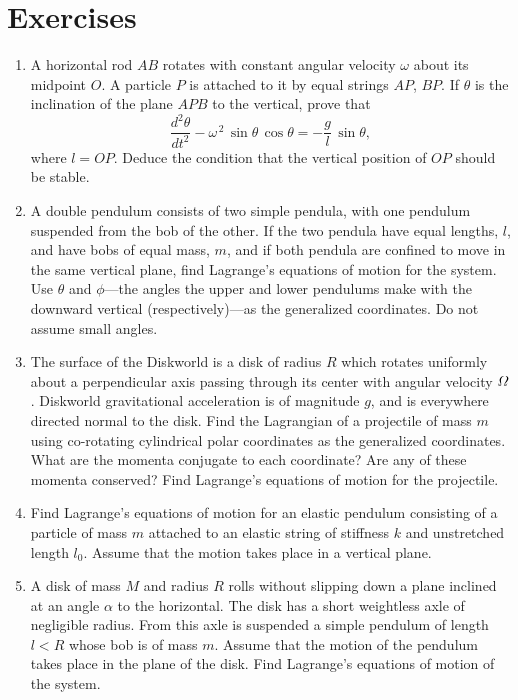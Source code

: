 \section{Exercises}
{\small
\renewcommand{\theenumi}{9.\arabic{enumi}}
\begin{enumerate}
\item A horizontal rod $AB$ rotates with constant angular velocity $\omega$ about
its midpoint $O$. A particle $P$ is attached to it by equal strings $AP$, $BP$.
If $\theta$ is the inclination of the plane $APB$ to the vertical, prove that
$$
\frac{d^2\theta}{dt^2} -\omega^{\,2}\,\sin\theta\,\cos\theta = -\frac{g}{l}\,\sin\theta,
$$
where $l=OP$. Deduce the condition that the vertical position of $OP$ should be stable.

\item A double pendulum consists of two simple pendula, with one pendulum
suspended from the bob of the other. If the two pendula have equal lengths, $l$,
and have bobs of equal mass, $m$, and if both pendula are confined to move in the
same vertical plane, find Lagrange's equations of motion for the system. 
Use $\theta$ and $\phi$---the angles the upper and
lower pendulums  make with the downward vertical (respectively)---as the
generalized coordinates. Do
not assume small angles.

\item The surface of the Diskworld is a disk of radius $R$ which
rotates uniformly about a perpendicular axis passing through
its center with angular velocity ${\mit\Omega}$. Diskworld gravitational acceleration is of magnitude
$g$, and is everywhere directed normal to the disk.
Find the Lagrangian
of a projectile of mass $m$ using co-rotating cylindrical polar coordinates as the generalized
coordinates. What are the momenta conjugate to each coordinate? Are
any of these momenta conserved? Find Lagrange's equations of motion for
the projectile.

\item Find  Lagrange's equations of motion for  an elastic pendulum consisting of a particle
of mass $m$ attached to an elastic string of stiffness $k$ and unstretched
length $l_0$. Assume that the motion takes place in a vertical plane.

\item A disk of mass $M$ and radius $R$ rolls without slipping down a plane inclined at an angle $\alpha$ to the horizontal.
The disk has a short weightless axle of negligible radius. From this axle is suspended a simple pendulum
of length $l< R$ whose bob is of mass $m$. Assume that the motion of the pendulum takes place in the
plane of the disk. Find Lagrange's equations of motion of the system.


\end{enumerate}}
